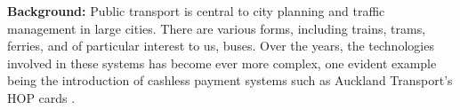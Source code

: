 \documentclass[12pt,a4paper]{article}
\begin{document}













\textbf{Background:}
Public transport is central to city planning and traffic management in large cities.
There are various forms, including trains, trams, ferries, and of particular interest to us, buses.
Over the years, the technologies involved in these systems has become ever more complex,
one evident example being the introduction of cashless payment systems such as 
Auckland Transport's HOP cards \citep{cn}.
\end{document}
